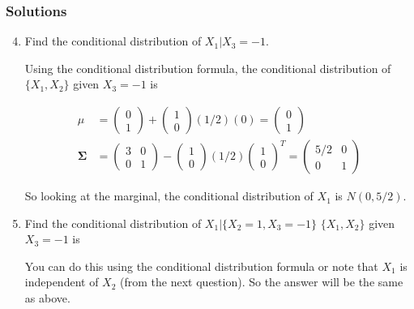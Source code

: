 \documentclass{beamer}
\begin{document}
\begin{frame}
\frametitle{Solutions}
\begin{enumerate}
\setcounter{enumi}{3}
\item Find the conditional distribution of $X_1|X_3 = -1$.
\vspace{5mm}

Using the conditional distribution formula, the conditional distribution of $\{X_1,X_2\}$ given $X_3 = -1$ is


\begin{align*}
\mu &= \begin{pmatrix} 0 \\ 1 \end{pmatrix} + \begin{pmatrix} 1 \\ 0 \end{pmatrix} (1/2) (0) =  \begin{pmatrix} 0 \\ 1 \end{pmatrix}\\
\mathbf{\Sigma} &= \begin{pmatrix} 3 & 0 \\0 & 1 \end{pmatrix} - \begin{pmatrix} 1 \\ 0 \end{pmatrix}(1/2) \begin{pmatrix} 1 \\ 0 \end{pmatrix}^T = \begin{pmatrix}5/2 & 0\\0 & 1\end{pmatrix}
\end{align*}

So looking at the marginal, the conditional distribution of $X_1$ is $N(0, 5/2)$.

\item Find the conditional distribution of $X_1|\{X_2 = 1, X_3 = -1\}$
$\{X_1, X_2\}$ given $X_3 = -1$ is

You can do this using the conditional distribution formula or note that $X_1$ is independent of $X_2$ (from the next question).  So the answer will be the same as above.
\end{enumerate}
\end{frame}
\end{document}
